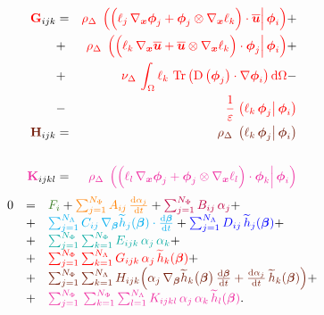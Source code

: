 \documentclass[10pt,a4paper]{article}
\begin{document}
\begin{eqnarray}
\textcolor{red}{\mat G}_{ijk} &=& \textcolor{red}{\rho_\Delta\,  \prodscal{\Big( \ell_j \, \grad_{\vx}\vphi_j+ \vphi_j \otimes\grad_{\vx}\ell_k\Big)\cdot \bu}{\vphi_i}} +  \\
&+& \textcolor{red}{\rho_\Delta\,  \prodscal{\Big( \ell_k \, \grad_{\vx}\bu+ \bu\otimes\grad_{\vx}\ell_k\Big) \cdot \vphi_j }{\vphi_i}} +  \\
&+& \textcolor{red}{\nu_\Delta\,\int_\Omega \ell_k \, \trace{\D{\vphi_j}\cdot\grad \vphi_i} \d \Omega} -
\\
&-& \textcolor{red}{\frac{1}{\varepsilon} \prodscal{\ell_k\,\vphi_j}{\vphi_i}} \\
\textcolor{Brown}{\mat H}_{ijk} &=& \textcolor{Brown}{\rho_\Delta\, \prodscal{\ell_k\,\vphi_j}{\vphi_i}}  \\
\\
\textcolor{Rhodamine}{\mat K}_{ijkl} &= & \textcolor{Rhodamine}{\rho_\Delta\, \prodscal{\Big( \ell_l \, \grad_{\vx}\vphi_j+ \vphi_j \otimes\grad_{\vx}\ell_l\Big)\cdot \vphi_k }{\vphi_i}} \\
\end{eqnarray}
%
\begin{equation}
\begin{array}{rcl}
0 &=& \textcolor{OliveGreen}{F_i} + \textcolor{orange}{\sum_{j=1}^{N_\Phi} A_{ij} \, \dt{\alpha_j}}+ \textcolor{purple}{\sum_{j=1}^{N_\Phi} B_{ij}\,{\alpha_j}}+  \\
&+& \textcolor{cyan}{\sum_{j=1}^{N_\Lambda} C_{ij}\,\grad_{\vec \beta}\th_j(\vec \beta) \cdot \dt{\vec \beta}} + \textcolor{blue}{\sum_{j=1}^{N_\Lambda} D_{ij}\,\th_j(\vec \beta)} + \\
&+& \textcolor{Emerald}{\sum_{j=1}^{N_\Phi}\sum_{k=1}^{N_\Phi} E_{ijk}\,{\alpha_j}\,{\alpha_k}}+  \\
&+& \textcolor{red}{\sum_{j=1}^{N_\Phi}\sum_{k=1}^{N_\Lambda} G_{ijk}\,{\alpha_j}\,{\th_k(\vec \beta)}}+  \\
&+& \textcolor{Brown}{\sum_{j=1}^{N_\Phi} \sum_{k=1}^{N_\Lambda}  H_{ijk} \Big(\alpha_j \,  \grad_{\vec \beta}\th_k \big(\vec \beta\big)\,\dt{\vec \beta}+ \dt{\alpha_j}\, \th_k(\vec \beta)\Big)}+ \\
&+& \textcolor{Rhodamine}{\sum_{j=1}^{N_\Phi} \,\sum_{k=1}^{N_\Phi} \sum_{l=1}^{N_\Lambda}
K_{ijkl}\, \alpha_j \, \alpha_k \,\th_l (\vec \beta)}.
\end{array}
\end{equation}
%
\end{document}
